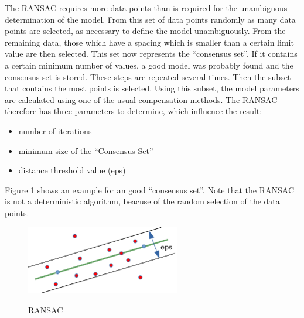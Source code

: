 
The \ac{RANSAC} requires more data points than is required for the unambiguous determination of the model. 
From this set of data points randomly as many data points are selected, as necessary to define the model unambiguously. 
From the remaining data, those which have a spacing which is smaller than a certain limit value are then selected.
This set now represents the ``consensus set''. If it contains a certain minimum number of values, a good model was probably found and the consensus set is stored.
These steps are repeated several times. Then the subset that contains the most points is selected. Using this subset, 
the model parameters are calculated using one of the usual compensation methods. The \ac{RANSAC} therefore has three parameters to determine, which influence the result:

\begin{itemize}
 \item number of iterations
 \item minimum size of the ``Consensus Set''
 \item distance threshold value (eps)
\end{itemize}
Figure \ref{ransac} shows an example for an good ``consensus set''. Note that the \ac{RANSAC} is not a deterministic algorithm, beacuse of the random selection of the data points.

\begin{figure}[!ht]
\begin{center}
\caption{\acs{RANSAC}}
\includegraphics[width=0.6\textwidth]{bilder/ransac.pdf}
\label{ransac}
\end{center}
\end{figure}

